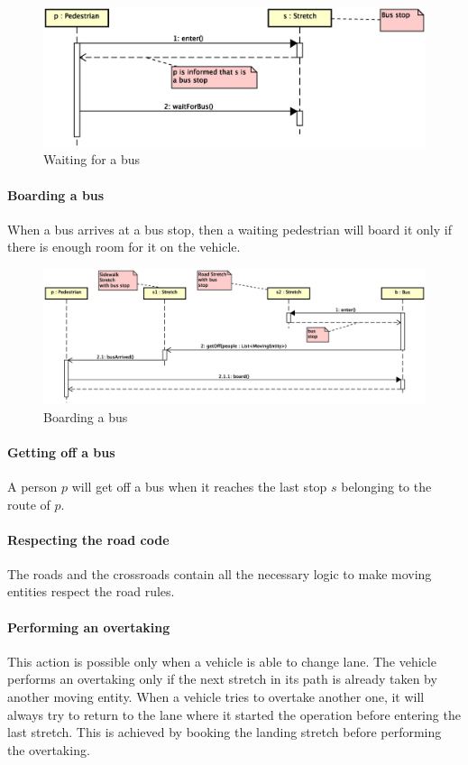 \begin{figure}[H]
  \centering
  \includegraphics[width=\columnwidth,trim=1 0 2 0,clip]
    {images/solution/bus_waiting.eps}
  \caption{Waiting for a bus}
  \label{fig:app-inter-wait-bus}
\end{figure}

\paragraph{Boarding a bus}
When a bus arrives at a bus stop, then a waiting pedestrian will board it only
if there is enough room for it on the vehicle.

\begin{figure}[H]
  \centering
  \includegraphics[width=\columnwidth,trim=1 0 0 0,clip]
    {images/solution/bus_boarding.eps}
  \caption{Boarding a bus}
  \label{fig:app-inter-board-bus}
\end{figure}

\paragraph{Getting off a bus} A person $p$ will get off a bus when it reaches
the last stop $s$ belonging to the route of $p$.

\paragraph{Respecting the road code} The roads and the crossroads contain
all the necessary logic to make moving entities respect the road rules.

\paragraph{Performing an overtaking} This action is possible only when a
vehicle is able to change lane. The vehicle performs an overtaking
only if the next stretch in its path is already taken by another moving entity.
When a vehicle tries to overtake another one, it will always try to return to
the lane where it started the operation before entering the last stretch. This
is achieved by booking the landing stretch before performing the
overtaking.

